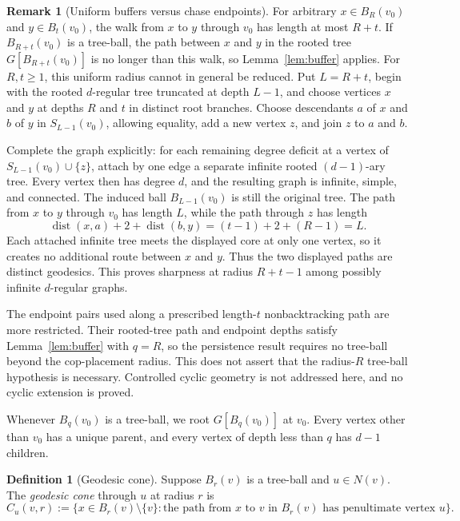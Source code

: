 \documentclass[11pt]{amsart}
\theoremstyle{definition}
\newtheorem{definition}[theorem]{Definition}
\newtheorem{remark}[theorem]{Remark}
\DeclareMathOperator{\dist}{dist}
\begin{document}
\begin{remark}[Uniform buffers versus chase endpoints]
For arbitrary $x\in B_R(v_0)$ and $y\in B_t(v_0)$, the walk from $x$ to $y$ through $v_0$ has length at most $R+t$. If $B_{R+t}(v_0)$ is a tree-ball, the path between $x$ and $y$ in the rooted tree $G[B_{R+t}(v_0)]$ is no longer than this walk, so Lemma~\ref{lem:buffer} applies. For $R,t\geq1$, this uniform radius cannot in general be reduced. Put $L=R+t$, begin with the rooted $d$-regular tree truncated at depth $L-1$, and choose vertices $x$ and $y$ at depths $R$ and $t$ in distinct root branches. Choose descendants $a$ of $x$ and $b$ of $y$ in $S_{L-1}(v_0)$, allowing equality, add a new vertex $z$, and join $z$ to $a$ and $b$.

Complete the graph explicitly: for each remaining degree deficit at a vertex of $S_{L-1}(v_0)\cup\{z\}$, attach by one edge a separate infinite rooted $(d-1)$-ary tree. Every vertex then has degree $d$, and the resulting graph is infinite, simple, and connected. The induced ball $B_{L-1}(v_0)$ is still the original tree. The path from $x$ to $y$ through $v_0$ has length $L$, while the path through $z$ has length
\[
\dist(x,a)+2+\dist(b,y)=(t-1)+2+(R-1)=L.
\]
Each attached infinite tree meets the displayed core at only one vertex, so it creates no additional route between $x$ and $y$. Thus the two displayed paths are distinct geodesics. This proves sharpness at radius $R+t-1$ among possibly infinite $d$-regular graphs.

The endpoint pairs used along a prescribed length-$t$ nonbacktracking path are more restricted. Their rooted-tree path and endpoint depths satisfy Lemma~\ref{lem:buffer} with $q=R$, so the persistence result requires no tree-ball beyond the cop-placement radius. This does not assert that the radius-$R$ tree-ball hypothesis is necessary. Controlled cyclic geometry is not addressed here, and no cyclic extension is proved.
\end{remark}

Whenever $B_q(v_0)$ is a tree-ball, we root $G[B_q(v_0)]$ at $v_0$. Every vertex other than $v_0$ has a unique parent, and every vertex of depth less than $q$ has $d-1$ children.

\begin{definition}[Geodesic cone]
\label{def:cone}
Suppose $B_r(v)$ is a tree-ball and $u\in N(v)$. The \emph{geodesic cone} through $u$ at radius $r$ is
\[
C_u(v,r):=\{x\in B_r(v)\setminus\{v\}:\text{the path from $x$ to $v$ in $B_r(v)$ has penultimate vertex $u$}\}.
\]
\end{definition}
\end{document}
